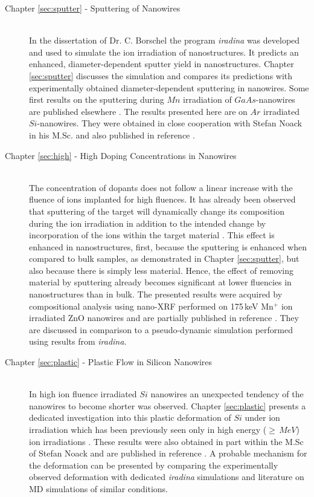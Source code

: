 \begin{description}
  \item[\normalfont Chapter \ref{sec:sputter} - Sputtering of Nanowires] \hfill \\
  In the dissertation of Dr. C. Borschel \cite{borschel_ion-solid_2012} the program \emph{iradina} \cite{borschel_ion_2011} was developed and used to simulate the ion irradiation of nanostructures. It predicts an enhanced, diameter-dependent sputter yield in nanostructures. Chapter \ref{sec:sputter} discusses the simulation and compares its predictions with experimentally obtained diameter-dependent sputtering in nanowires. Some first results on the sputtering during $Mn$ irradiation of $GaAs$-nanowires are published elsewhere \cite{johannes_enhanced_2014}. The results presented here are on $Ar$ irradiated $Si$-nanowires. They were obtained in close cooperation with Stefan Noack \cite{noack_sputter_2014} in his M.Sc. and also published in reference \cite{johannes_anomalous_2015}.
  \item[\normalfont Chapter \ref{sec:high} - High Doping Concentrations in Nanowires] \hfill \\
  The concentration of dopants does not follow a linear increase with the fluence of ions implanted for high fluences. It has already been observed that sputtering of the target will dynamically change its composition during the ion irradiation in addition to the intended change by incorporation of the ions within the target material \cite{moller_tridyn_1984,moller_tridyn-binary_1988,miyagawa_computer_1991,sigmund_alloy_1993,eckstein_oscillations_2000}. This effect is enhanced in nanostructures, first, because the sputtering is enhanced when compared to bulk samples, as demonstrated in Chapter \ref{sec:sputter}, but also because there is simply less material. Hence, the effect of removing material by sputtering already becomes significant at lower fluencies in nanostructures than in bulk. The presented results were acquired by compositional analysis using nano-XRF performed on 175\,keV Mn$^+$ ion irradiated ZnO nanowires and are partially published in reference \cite{johannes_enhanced_2014}. They are discussed in comparison to a pseudo-dynamic simulation performed using results from \emph{iradina}.
  \item[\normalfont Chapter \ref{sec:plastic} - Plastic Flow in Silicon Nanowires] \hfill \\
  In high ion fluence irradiated $Si$ nanowires an unexpected tendency of the nanowires to become shorter was observed. Chapter \ref{sec:plastic} presents a dedicated investigation into this plastic deformation of $Si$ under ion irradiation which has been previously seen only in high energy ($\ge\,MeV$) ion irradiations \cite{volkert_stress_1991,trinkaus_viscoelastic_1995,hedler_amorphous_2004,hedler_boundary_2005}. These results were also obtained in part within the M.Sc of Stefan Noack \cite{noack_sputter_2014} and are published in reference \cite{johannes_anomalous_2015}. A probable mechanism for the deformation can be presented by comparing the experimentally observed deformation with dedicated \emph{iradina} simulations and literature on MD simulations of similar conditions.
\end{description}
